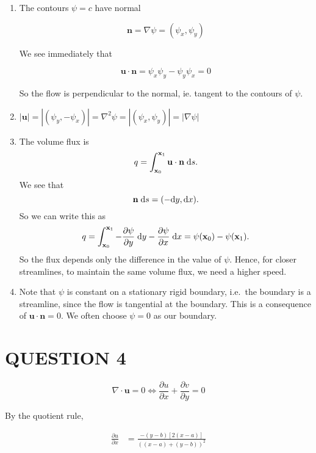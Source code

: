 \documentclass[a4paper]{article}
\begin{document}
\begin{enumerate}
	\item The contours $ \psi = c $ have normal
	
	\[ \mathbf{n} = \nabla  \psi = (\psi_{x},\psi_{y}) \]
	
	We see immediately that
	
	\[ \mathbf{u} \cdot \mathbf{n} = \psi_{x} \psi_{y} - \psi_{y} \psi_{x} = 0 \]
	
	So the flow is perpendicular to the normal, ie. tangent to the contours of $ \psi $. 
	
	\item $ \left| \mathbf{u} \right| = | (\psi_{y},-\psi_{x}) | = \nabla^{2} \psi = | (\psi_{x},\psi_{y}) | = | \nabla \psi | $
	
	
	\item The volume flux is
	\[
	q = \int_{\mathbf{x}_0}^{\mathbf{x}_1} \mathbf{u}\cdot \mathbf{n}\;\mathrm{d} s.
	\]
	We see that
	\[
	\mathbf{n}\;\mathrm{d} s = (-\mathrm{d} y, \mathrm{d} x).
	\]
	So we can write this as
	\[
	q = \int_{\mathbf{x}_0}^{\mathbf{x}_1} -\frac{\partial \psi}{\partial y}\;\mathrm{d} y - \frac{\partial \psi}{\partial x}\;\mathrm{d} x = \psi(\mathbf{x}_0) - \psi(\mathbf{x}_1).
	\]
	So the flux depends only the difference in the value of $\psi$. Hence, for closer streamlines, to maintain the same volume flux, we need a higher speed.
	
	\item Note that $\psi$ is constant on a stationary rigid boundary, i.e.\ the boundary is a streamline, since the flow is tangential at the boundary. This is a consequence of $\mathbf{u}\cdot \mathbf{n} = 0$. We often choose $\psi = 0$ as our boundary.
	
	
\end{enumerate}









\section{QUESTION 4}

\[ \nabla \cdot \mathbf{u} = 0 \iff \frac{\partial u }{\partial x} + \frac{\partial v}{\partial y} = 0  \]

By the quotient rule,

\begin{align*}
\frac{\partial u }{\partial x}& = \frac{-(y-b)[2(x-a)]}{( (x-a) + (y-b))^{2}} 
\end{align*}
\end{document}
